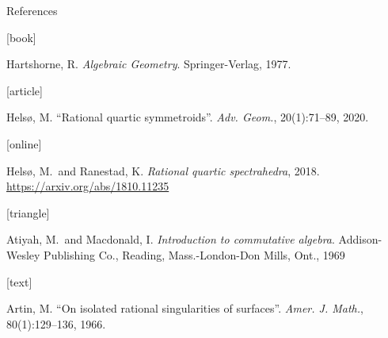 \documentclass[UKenglish, aspectratio = 169]{beamer}
\begin{document}
\begin{frame}[allowframebreaks]{References}
    \begin{thebibliography}{}

        [book]

        Hartshorne, R.
        \newblock \emph{Algebraic Geometry}.
        \newblock Springer-Verlag, 1977.

        [article]

        Helsø, M.
        \newblock \enquote{Rational quartic symmetroids}.
        \newblock \emph{Adv. Geom.}, 20(1):71--89, 2020.

        [online]

        Helsø, M.\ and Ranestad, K.
        \newblock \emph{Rational quartic spectrahedra}, 2018.
        \newblock \url{https://arxiv.org/abs/1810.11235}

        [triangle]

        Atiyah, M.\ and Macdonald, I.
        \newblock \emph{Introduction to commutative algebra}.
        \newblock Addison-Wesley Publishing Co., Reading, Mass.-London-Don
        Mills, Ont., 1969

        [text]

        Artin, M.
        \newblock \enquote{On isolated rational singularities of surfaces}.
        \newblock \emph{Amer. J. Math.}, 80(1):129--136, 1966.

    \end{thebibliography}
\end{frame}
\end{document}
